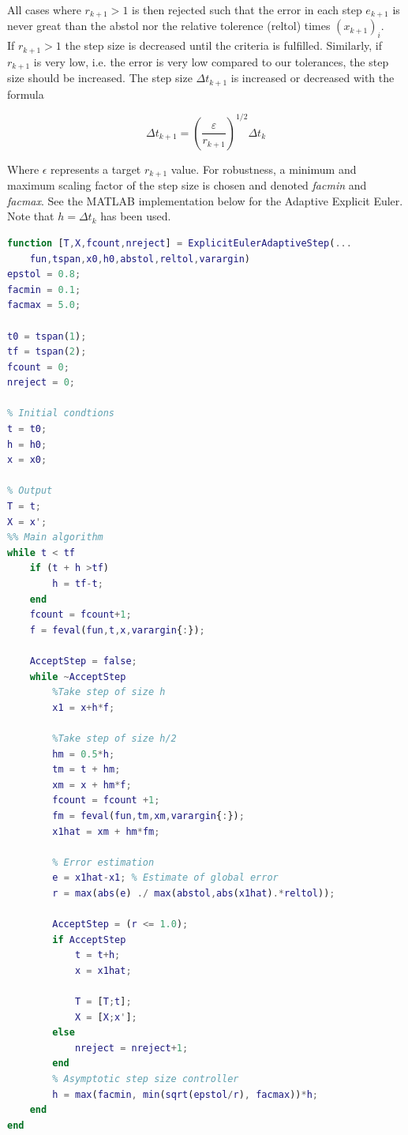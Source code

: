 All cases where $r_{k+1} > 1$ is then rejected such that the error in each step $e_{k+1}$ is never great than the abstol nor the relative tolerence (reltol) times $(x_{k+1})_i$. 
\\
If $r_{k+1} > 1$ the step size is decreased until the criteria is fulfilled. Similarly, if $r_{k+1}$ is very low, i.e. the error is very low compared to our tolerances, the step size should be increased.
The step size $\Delta t_{k+1}$ is increased or decreased with the formula

\begin{equation}
\Delta t_{k+1}=\left(\frac{\varepsilon}{r_{k+1}}\right)^{1 / 2} \Delta t_{k}
\end{equation}

Where $\epsilon$ represents a target $r_{k+1}$ value. For robustness, a minimum and maximum scaling factor of the step size is chosen and denoted \textit{facmin} and \textit{facmax}. See the MATLAB implementation below for the Adaptive Explicit Euler. Note that $h = \Delta t_{k}$ has been used.

\begin{adjustwidth*}{0cm}{-0.4cm}
\begin{lstlisting}[frame=single, language=Matlab,caption=Explicit Euler (adaptive step size), label=ExplicitEulerFixie]
function [T,X,fcount,nreject] = ExplicitEulerAdaptiveStep(...
    fun,tspan,x0,h0,abstol,reltol,varargin)
epstol = 0.8;
facmin = 0.1;
facmax = 5.0;

t0 = tspan(1);
tf = tspan(2);
fcount = 0;
nreject = 0;

% Initial condtions
t = t0;
h = h0;
x = x0;

% Output
T = t;
X = x';
%% Main algorithm
while t < tf
    if (t + h >tf)
        h = tf-t;
    end
    fcount = fcount+1;
    f = feval(fun,t,x,varargin{:});

    AcceptStep = false;
    while ~AcceptStep
        %Take step of size h
        x1 = x+h*f;

        %Take step of size h/2
        hm = 0.5*h;
        tm = t + hm;
        xm = x + hm*f;
        fcount = fcount +1;
        fm = feval(fun,tm,xm,varargin{:});
        x1hat = xm + hm*fm;

        % Error estimation
        e = x1hat-x1; % Estimate of global error
        r = max(abs(e) ./ max(abstol,abs(x1hat).*reltol));

        AcceptStep = (r <= 1.0);
        if AcceptStep
            t = t+h;
            x = x1hat;

            T = [T;t];
            X = [X;x'];
        else
            nreject = nreject+1;
        end
        % Asymptotic step size controller
        h = max(facmin, min(sqrt(epstol/r), facmax))*h;
    end
end
\end{lstlisting}
\end{adjustwidth*}

